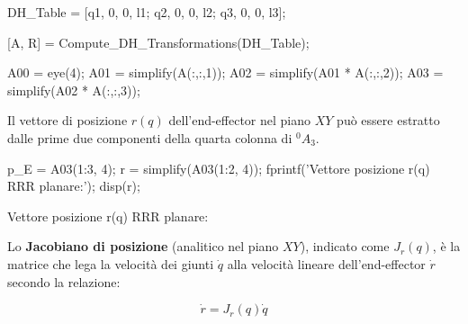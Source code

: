 \documentclass[11pt, a4paper]{article}
\begin{document}
\begin{matlabcode}
DH_Table = [q1, 0, 0, l1;
            q2, 0, 0, l2;
            q3, 0, 0, l3];

[A, R] = Compute_DH_Transformations(DH_Table);

A00 = eye(4);
A01 = simplify(A(:,:,1));       %
A02 = simplify(A01 * A(:,:,2)); %
A03 = simplify(A02 * A(:,:,3)); %
\end{matlabcode}

\begin{par}
\begin{flushleft}
Il vettore di posizione $r(q)$ dell'end-effector nel piano $XY$ può essere estratto dalle prime due componenti della quarta colonna di $^0 A_3$.
\end{flushleft}
\end{par}

\begin{matlabcode}
p_E = A03(1:3, 4);
r = simplify(A03(1:2, 4));
fprintf('Vettore posizione r(q) RRR planare:');
disp(r);
\end{matlabcode}
\begin{matlaboutput}
Vettore posizione r(q) RRR planare:
\end{matlaboutput}


\begin{par}
\begin{flushleft}
Lo \textbf{Jacobiano di posizione} (analitico nel piano $XY$), indicato come $J_r (q)$, è la matrice che lega la velocità dei giunti $\dot{q}$ alla velocità lineare dell'end-effector $\dot{r}$ secondo la relazione:
\end{flushleft}
\end{par}

\[
    \dot{r}=J_r (q)\dot{q}
\]
\end{document}
